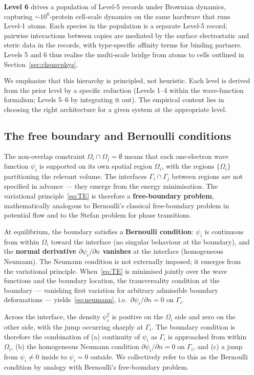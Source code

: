 \documentclass[11pt]{article}
\begin{document}
\textbf{Level 6} drives a population of Level-5 records under Brownian dynamics, capturing $\sim 10^6$-protein cell-scale dynamics on the same hardware that runs Level-1 atoms. Each species in the population is a separate Level-5 record; pairwise interactions between copies are mediated by the surface electrostatic and steric data in the records, with type-specific affinity terms for binding partners. Levels 5 and 6 thus realise the multi-scale bridge from atoms to cells outlined in Section~\ref{sec:chemvphys}.

We emphasize that this hierarchy is principled, not heuristic. Each level is derived from the prior level by a specific reduction (Levels 1--4 within the wave-function formalism; Levels 5--6 by integrating it out). The empirical content lies in choosing the right architecture for a given system at the appropriate level.

\subsection{The free boundary and Bernoulli conditions}\label{sec:bernoulli}

The non-overlap constraint $\Omega_i \cap \Omega_j = \emptyset$ means that each one-electron wave function $\psi_i$ is supported on its own spatial region $\Omega_i$, with the regions $\{\Omega_i\}$ partitioning the relevant volume. The interfaces $\Gamma_i \cap \Gamma_j$ between regions are not specified in advance --- they emerge from the energy minimisation. The variational principle~\eqref{eq:TE} is therefore a \textbf{free-boundary problem}, mathematically analogous to Bernoulli's classical free-boundary problem in potential flow and to the Stefan problem for phase transitions.

At equilibrium, the boundary satisfies a \textbf{Bernoulli condition}: $\psi_i$ is continuous from within $\Omega_i$ toward the interface (no singular behaviour at the boundary), and the \textbf{normal derivative $\partial \psi_i / \partial n$ vanishes} at the interface (homogeneous Neumann). The Neumann condition is not externally imposed; it emerges from the variational principle. When~\eqref{eq:TE} is minimised jointly over the wave functions and the boundary location, the transversality condition at the boundary --- vanishing first variation for arbitrary admissible boundary deformations --- yields~\eqref{eq:neumann}, i.e.\ $\partial \psi_i / \partial n = 0$ on $\Gamma_i$.

Across the interface, the density $\psi_i^2$ is positive on the $\Omega_i$ side and zero on the other side, with the jump occurring sharply at $\Gamma_i$. The boundary condition is therefore the combination of (a) continuity of $\psi_i$ as $\Gamma_i$ is approached from within $\Omega_i$, (b) the homogeneous Neumann condition $\partial \psi_i / \partial n = 0$ on $\Gamma_i$, and (c) a jump from $\psi_i \ne 0$ inside to $\psi_i = 0$ outside. We collectively refer to this as the Bernoulli condition by analogy with Bernoulli's free-boundary problem.
\end{document}
